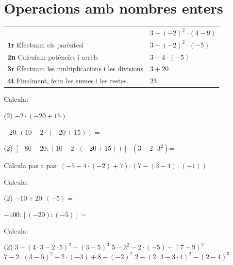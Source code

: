 \newpage
\section{Operacions amb nombres enters}

\begin{theorybox}
	\begin{tabular}{ll}
		& $3 - (-2)^{2} \cdot ( 4 - 9)$ \\
		\textbf{1r} Efectuam els parèntesi          &     $ 3 - (-2)^{2} \cdot (-5)$ \\
		
		\textbf{2n} Calculam potències i arrels        &    $ 3 - 4 \cdot (-5)$     \\
		
		\textbf{3r} Efectuam les multiplicacions i les divisions &  $ 3 + 20$ \\
		
		\textbf{4t }Finalment, feim les sumes i les restes.       &                      $23$
	\end{tabular}
\end{theorybox}

\begin{mylist}
	\exer  \spen  Calcula:

\begin{tasks}(2)
	\task  $-2 \cdot (-20 + 15)  =$    
	
	\task  $-20 : \left(10 - 2\cdot (-20 + 15) \right) =$      
	
	\task*(2) $\left[-80 -20 : \left(10 - 2\cdot (-20 + 15) \right) \right] \cdot (3 - 2 \cdot 3^{2})$=
	
\end{tasks}
\vso
 	\answers{[$10$, $-1$, $1215$]}



	\exer  \spen  Calcula pas a pas:   $(-5 + 4 \cdot (-2) +7) : (7 - (3 - 4)\cdot (-1))$
\vsoo







	\exer  \spen  Calcula:

\begin{tasks}(2)
	\task $-10 + 20 : (-5) =$ 
 
	\task $-100 : \left[ (-20) : (-5) \right]=$ 
 
\end{tasks} 
\answers{[$-14$, $-25$]}



	
\exer[1]  Calcula:

\begin{tasks}(2)
\task $3-(4\cdot 3-2\cdot 5)^{2} -(3-5)^{3} $   \task $5-3^{2} -2\cdot (-5)-(7-9)^{2} $
\task $7-2\cdot (3-5)^{2} +2\cdot (-3)+8-(-2)^{2} $  \task $2-(2\cdot 3-3\cdot 4)^{2} -(2-4)^{3} $
\end{tasks} 
\answers[cols=2]{[$7$, $2$, $-3$, $-26$]}

\end{mylist}

